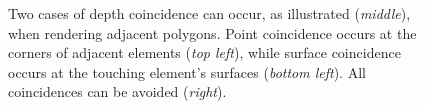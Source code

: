 \documentclass[journal]{vgtc}                %
\begin{document}
\begin{figure}[b]
\begin{minipage}{1.5cm}
     \end{minipage}
     \begin{minipage}{4.25cm} 
     \end{minipage}
     \begin{minipage}{2.75cm} 
     \end{minipage}    
  \caption{Two cases of depth coincidence can occur, as illustrated ({\it middle}), when rendering adjacent polygons. Point coincidence occurs at the corners of adjacent elements ({\it top left}), while surface coincidence occurs at the touching element's surfaces ({\it bottom left}). All coincidences can be avoided ({\it right}).}  
  \label{fig:depthcoincidence}
\end{figure}
\end{document}
